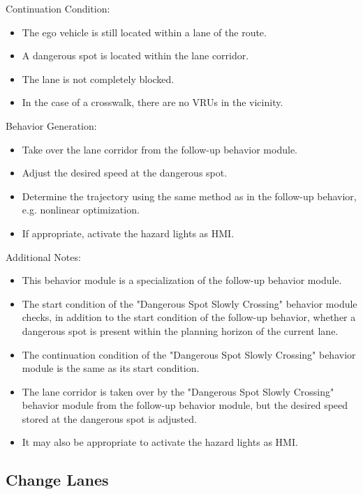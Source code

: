     Continuation Condition:

\begin{itemize}
    \item The ego vehicle is still located within a lane of the route.
    \item A dangerous spot is located within the lane corridor.
    \item The lane is not completely blocked.
    \item In the case of a crosswalk, there are no VRUs in the vicinity.
\end{itemize}

    Behavior Generation:

\begin{itemize}
    \item Take over the lane corridor from the follow-up behavior module.
    \item Adjust the desired speed at the dangerous spot.
    \item Determine the trajectory using the same method as in the follow-up behavior, e.g. nonlinear optimization.
    \item If appropriate, activate the hazard lights as HMI.
\end{itemize}

Additional Notes:

\begin{itemize}
    \item This behavior module is a specialization of the follow-up behavior module.
    \item The start condition of the "Dangerous Spot Slowly Crossing" behavior module checks, in addition to the start condition of the follow-up behavior, whether a dangerous spot is present within the planning horizon of the current lane.
    \item The continuation condition of the "Dangerous Spot Slowly Crossing" behavior module is the same as its start condition.
    \item The lane corridor is taken over by the "Dangerous Spot Slowly Crossing" behavior module from the follow-up behavior module, but the desired speed stored at the dangerous spot is adjusted.
    \item It may also be appropriate to activate the hazard lights as HMI.
\end{itemize}

\subsection{Change Lanes}

